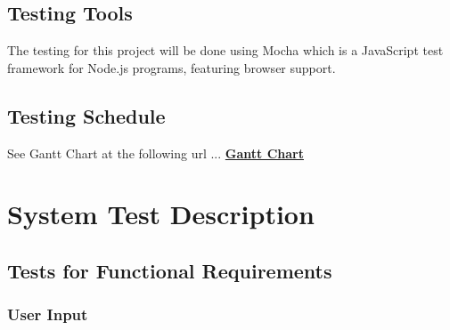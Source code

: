 \documentclass[12pt, titlepage]{article}
\begin{document}
\subsection{Testing Tools}
The testing for this project will be done using Mocha which is a JavaScript test framework for Node.js programs, featuring browser support.

\subsection{Testing Schedule}
		
See Gantt Chart at the following url ...
\href{https://gitlab.cas.mcmaster.ca/chowdr11/3xa3/-/tree/master/BlankProjectTemplate/ProjectSchedule}
{\textbf{Gantt Chart}}\\

\section{System Test Description}
	
\subsection{Tests for Functional Requirements}

\subsubsection{User Input}
\end{document}
